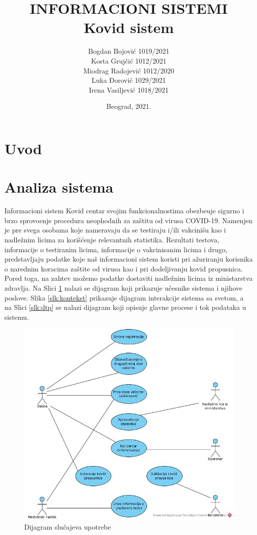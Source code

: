 \documentclass[titlepage]{article}
\title{INFORMACIONI SISTEMI\\Kovid sistem}
\author{
Bogdan Bojović 1019/2021\\
Kosta Grujčić 1012/2021\\
Miodrag Radojević 1012/2020\\
Luka Đorović 1029/2021\\
Irena Vasiljević 1018/2021
}
\date{Beograd, 2021.}
\begin{document}
\maketitle
\tableofcontents

\newpage

\section{Uvod}

\section{Analiza sistema}

Informacioni sistem Kovid centar svojim funkcionalnostima obezbe\dj{}uje sigurno i brzo sprovo\dj{}enje procedura neophodnih za za\v{s}titu od virusa COVID-19. Namenjen je pre svega osobama koje nameravaju da se testiraju i/ili vakcini\v{s}u kao i nadle\v{z}nim licima za kori\v{s}\'{c}enje relevantnih statistika.\newline
\indent Rezultati testova, informacije o testiranim licima, informacije o vakcinisanim licima i drugo, predstavljaju podatke koje na\v{s} informacioni sistem koristi pri a\v{z}uriranju korisnika o narednim koracima za\v{s}tite od virusa kao i pri dodeljivanju kovid propusnica. Pored toga, na zahtev mo\v{z}emo podatke dostaviti nadle\v{z}nim licima iz ministarstva zdravlja.\newline
\indent Na Slici \ref{slk:slucajevi} nalazi se dijagram koji prikazuje učesnike sistema i njihove poslove. Slika \ref{slk:kontekst} prikazuje dijagram interakcije sistema sa svetom, a na Slici \ref{slk:dtp} se nalazi dijagram koji opisuje glavne procese i tok podataka u sistemu.

\begin{figure}[H]
\centering
\includegraphics[scale=0.5]{Dijagram_slucajeva_upotrebe}
\caption{Dijagram slučajeva upotrebe}
\label{slk:slucajevi}
\end{figure}
\end{document}
